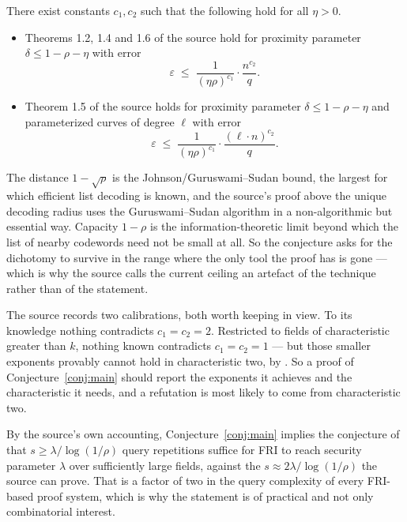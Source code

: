 \documentclass{aicr-conjecture}
\newcommand{\eps}{\varepsilon}
\begin{document}
\begin{conjecture}\label{conj:main}
There exist constants $c_{1}, c_{2}$ such that the following hold for all
$\eta > 0$.
\begin{itemize}[nosep]
  \item Theorems 1.2, 1.4 and 1.6 of the source hold for proximity
    parameter $\delta \le 1 - \rho - \eta$ with error
    \[
      \eps \;\le\; \frac{1}{(\eta\rho)^{c_{1}}} \cdot
      \frac{n^{c_{2}}}{q}.
    \]
  \item Theorem 1.5 of the source holds for proximity parameter $\delta
    \le 1 - \rho - \eta$ and parameterized curves of degree $\ell$ with
    error
    \[
      \eps \;\le\; \frac{1}{(\eta\rho)^{c_{1}}} \cdot
      \frac{(\ell \cdot n)^{c_{2}}}{q}.
    \]
\end{itemize}
\end{conjecture}

\begin{remark}
The distance $1 - \sqrt{\rho}$ is the Johnson/Guruswami--Sudan bound, the
largest for which efficient list decoding is known, and the source's
proof above the unique decoding radius uses the Guruswami--Sudan
algorithm in a non-algorithmic but essential way. Capacity $1 - \rho$ is
the information-theoretic limit beyond which the list of nearby
codewords need not be small at all. So the conjecture asks for the
dichotomy to survive in the range where the only tool the proof has is
gone --- which is why the source calls the current ceiling an artefact of
the technique rather than of the statement.
\end{remark}

\begin{remark}
The source records two calibrations, both worth keeping in view. To its
knowledge nothing contradicts $c_{1} = c_{2} = 2$. Restricted to fields
of characteristic greater than $k$, nothing known contradicts $c_{1} =
c_{2} = 1$ --- but those smaller exponents provably cannot hold in
characteristic two, by {\cite[Appendix B]{BGKS20}}. So a proof of
Conjecture~\ref{conj:main} should report the exponents it achieves and
the characteristic it needs, and a refutation is most likely to come from
characteristic two.
\end{remark}

\begin{remark}
By the source's own accounting, Conjecture~\ref{conj:main} implies the
conjecture of {\cite{BBHR18b}} that $s \ge \lambda/\log(1/\rho)$ query
repetitions suffice for FRI to reach security parameter $\lambda$ over
sufficiently large fields, against the $s \approx 2\lambda/\log(1/\rho)$
the source can prove. That is a factor of two in the query complexity of
every FRI-based proof system, which is why the statement is of practical
and not only combinatorial interest.
\end{remark}
\end{document}
